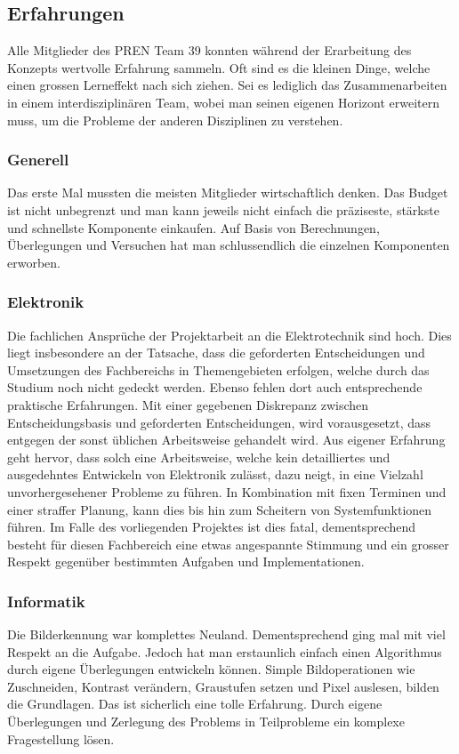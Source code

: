 \subsection{Erfahrungen}
Alle Mitglieder des PREN Team 39 konnten während der Erarbeitung des Konzepts
wertvolle Erfahrung sammeln. Oft sind es die kleinen Dinge, welche einen
grossen Lerneffekt nach sich ziehen. Sei es lediglich das Zusammenarbeiten
in einem interdisziplinären Team, wobei man seinen eigenen Horizont erweitern
muss, um die Probleme der anderen Disziplinen zu verstehen.

\subsubsection*{Generell}
Das erste Mal mussten die meisten Mitglieder wirtschaftlich denken. Das
Budget ist nicht unbegrenzt und man kann jeweils nicht einfach die präziseste,
stärkste und schnellste Komponente einkaufen. Auf Basis von Berechnungen,
Überlegungen und Versuchen hat man schlussendlich die einzelnen Komponenten
erworben.

\subsubsection*{Elektronik}
Die fachlichen Ansprüche der Projektarbeit an die Elektrotechnik sind hoch.
Dies liegt insbesondere an der Tatsache, dass die geforderten Entscheidungen
und Umsetzungen des Fachbereichs in Themengebieten erfolgen, welche durch
das Studium noch nicht gedeckt werden. Ebenso fehlen dort auch entsprechende
praktische Erfahrungen. Mit einer gegebenen Diskrepanz zwischen
Entscheidungsbasis und geforderten Entscheidungen, wird vorausgesetzt, dass
entgegen der sonst üblichen Arbeitsweise gehandelt wird. Aus eigener
Erfahrung geht hervor, dass solch eine Arbeitsweise, welche kein
detailliertes und ausgedehntes Entwickeln von Elektronik zulässt, dazu neigt,
in eine Vielzahl unvorhergesehener Probleme zu führen. In Kombination mit
fixen Terminen und einer straffer Planung, kann dies bis hin zum Scheitern
von Systemfunktionen führen. Im Falle des vorliegenden Projektes ist dies
fatal, dementsprechend besteht für diesen Fachbereich eine etwas angespannte
Stimmung und ein grosser Respekt gegenüber bestimmten Aufgaben und
Implementationen.

\subsubsection*{Informatik}
Die Bilderkennung war komplettes Neuland. Dementsprechend ging mal mit viel
Respekt an die Aufgabe. Jedoch hat man erstaunlich einfach einen Algorithmus
durch eigene Überlegungen entwickeln können. Simple Bildoperationen wie
Zuschneiden, Kontrast verändern, Graustufen setzen und Pixel auslesen, bilden
die Grundlagen. Das ist sicherlich eine tolle Erfahrung. Durch eigene
Überlegungen und Zerlegung des Problems in Teilprobleme ein komplexe
Fragestellung lösen.

